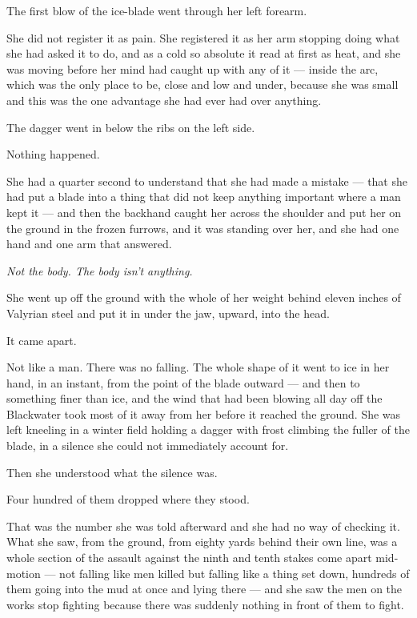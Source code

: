 The first blow of the ice-blade went through her left forearm.

She did not register it as pain. She registered it as her arm stopping doing what she had asked it to do, and as a cold so absolute it read at first as heat, and she was moving before her mind had caught up with any of it — inside the arc, which was the only place to be, close and low and under, because she was small and this was the one advantage she had ever had over anything.

The dagger went in below the ribs on the left side.

Nothing happened.

She had a quarter second to understand that she had made a mistake — that she had put a blade into a thing that did not keep anything important where a man kept it — and then the backhand caught her across the shoulder and put her on the ground in the frozen furrows, and it was standing over her, and she had one hand and one arm that answered.

\textit{Not the body. The body isn’t anything.}

She went up off the ground with the whole of her weight behind eleven inches of Valyrian steel and put it in under the jaw, upward, into the head.

It came apart.

Not like a man. There was no falling. The whole shape of it went to ice in her hand, in an instant, from the point of the blade outward — and then to something finer than ice, and the wind that had been blowing all day off the Blackwater took most of it away from her before it reached the ground. She was left kneeling in a winter field holding a dagger with frost climbing the fuller of the blade, in a silence she could not immediately account for.

Then she understood what the silence was.

\sceneBreak

Four hundred of them dropped where they stood.

That was the number she was told afterward and she had no way of checking it. What she saw, from the ground, from eighty yards behind their own line, was a whole section of the assault against the ninth and tenth stakes come apart mid-motion — not falling like men killed but falling like a thing set down, hundreds of them going into the mud at once and lying there — and she saw the men on the works stop fighting because there was suddenly nothing in front of them to fight.


